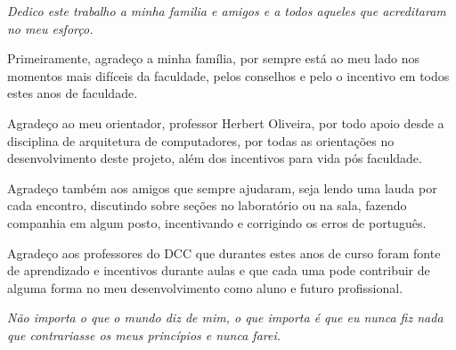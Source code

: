 \documentclass[
	12pt,				%
    oneside,			%
	a4paper,			%
	chapter=TITLE,		%
	english,			%
	brazil				%
	]{abntex2}
\begin{document}
\frenchspacing 


\imprimircapa

\imprimirfolhaderosto

\imprimirfolhadeaprovacao
\begin{dedicatoria}
   \vspace*{\fill}
   \centering
   \noindent
   \textit{Dedico este trabalho a minha familia e amigos e a todos aqueles que acreditaram no meu esforço. } \vspace*{\fill}
\end{dedicatoria}

\begin{agradecimentos}[Agradecimentos]
\par
Primeiramente, agradeço a minha família, por sempre está ao meu lado nos momentos mais difíceis da faculdade, pelos conselhos e pelo o incentivo em todos estes anos de faculdade.
\par
Agradeço ao meu orientador, professor Herbert Oliveira, por todo apoio desde a disciplina de arquitetura de computadores, por todas as orientações no desenvolvimento deste projeto, além dos incentivos para vida pós faculdade.
\par
Agradeço também aos amigos que sempre ajudaram, seja lendo uma lauda por cada encontro, discutindo sobre seções no laboratório ou na sala, fazendo companhia em algum posto, incentivando e corrigindo os erros de português. 
\par
Agradeço aos professores do DCC que durantes estes anos de curso foram fonte de aprendizado e incentivos durante aulas e que cada uma pode contribuir de alguma forma no meu desenvolvimento como aluno e futuro profissional.

\end{agradecimentos}

\begin{epigrafe}
    \vspace*{\fill}
	\begin{flushright}
		\textit{Não importa o que o mundo diz de mim, o que importa é que eu nunca fiz nada que contrariasse os meus princípios e nunca farei.}
	\end{flushright}
\end{epigrafe}
\end{document}
